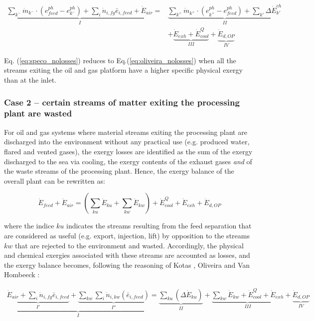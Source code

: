 \documentclass[times,3p]{elsarticle}
\begin{document}
 \begin{align}
	\underbrace{\sum_{k^{-}} \dot{m}_{k^{-}}\cdot(e_{feed}^{ph}-e_{k^{-}}^{ph})+\sum_i \dot{n}_{i,fg}\bar{e}_{i,feed}+\dot{E}_{air}}_{I}=&\underbrace{\sum_{k^{+}}\dot{m}_{k^{+}}\cdot(e_{k^{+}}^{ph}-e_{feed}^{ph})+\sum_{k'}\Delta{\dot{E}}^{ch}_{k'}}_{II}\nonumber\\
	&+\underbrace{\dot{E}_{exh}+\dot{E}^Q_{cool}}_{III}+\underbrace{\dot{E}_{d,OP}}_{IV}
	\label{eq:speco_nolosses}
\end{align}	

Eq. (\ref{eq:speco_nolosses}) reduces to Eq.(\ref{eq:oliveira_nolosses}) when all the streams exiting the oil and gas platform have a higher specific physical exergy than at the inlet.


\subsubsection{Case 2 -- certain streams of matter exiting the processing plant are wasted}

For oil and gas systems where material streams exiting the processing plant are discharged into the environment without any practical use (e.g. produced water, flared and vented gases), the exergy losses are identified as the sum of the exergy discharged to the sea via cooling, the exergy contents of the exhaust gases \emph{and} of the waste streams of the processing plant. Hence, the exergy balance of the overall plant can be rewritten as:

\begin{equation}
	\dot{E}_{feed}+\dot{E}_{air}=\left(\sum_{ku}\dot{E}_{ku}+\sum_{kw}\dot{E}_{kw}\right)+\dot{E}^{Q}_{cool}+\dot{E}_{exh}+\dot{E}_{d,OP}
\end{equation}

	where the indice $ku$ indicates the streams resulting from the feed separation that are considered as useful (e.g. export, injection, lift) by opposition to the streams $kw$ that are rejected to the environment and wasted. Accordingly, the physical and chemical exergies associated with these streams are accounted as losses, and the exergy balance becomes, following the reasoning of Kotas \cite{Kotas1995}, Oliveira and Van Hombeeck \cite{Oliveira1997}:

\begin{align}
	\underbrace{\underbrace{\dot{E}_{air}+\sum_i \dot{n}_{i,fg}\bar{e}_{i,feed}}_{I'}+\underbrace{\sum_{kw}\sum_i \dot{n}_{i,kw}(\bar{e}_{i,feed})}_{I''}}_{I}=\underbrace{\sum_{ku}\left(\Delta \dot{E}_{ku}\right)}_{II}+\underbrace{\sum_{kw} \dot{E}_{kw}+\dot{E}^{Q}_{cool}+\dot{E}_{exh}}_{III}+\underbrace{\dot{E}_{d,OP}}_{IV}
\label{eq:oliveira_losses}
\end{align}
\end{document}
